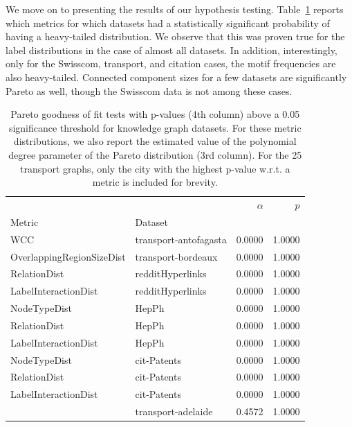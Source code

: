 We move on to presenting the results of our hypothesis testing. Table~\ref{tab:pareto} reports which metrics for which datasets had a statistically significant probability of having a heavy-tailed distribution. We observe that this was proven true for the label distributions in the case of almost all datasets. In addition, interestingly, only for the Swisscom, transport, and citation cases, the motif frequencies are also heavy-tailed. Connected component sizes for a few datasets are significantly Pareto as well, though the Swisscom data is not among these cases.

\begin{table}[hb!]
    \centering
\caption[Pareto goodness of fit tests with p-values above a 0.05 significance threshold for knowledge graph datasets.]{Pareto goodness of fit tests with p-values (4th column) above a 0.05 significance threshold for knowledge graph datasets. For these metric distributions, we also report the estimated value of the polynomial degree parameter of the Pareto distribution (3rd column). For the 25 transport graphs, only the city with the highest p-value w.r.t. a metric is included for brevity.}
\label{tab:pareto}
\begin{adjustbox}{width=0.75\columnwidth}
\begin{tabular}{llrr}
\toprule
             &                   &  $\alpha$ &  $p$ \\
Metric & Dataset &              &               \\
\midrule
WCC & transport-antofagasta &       0.0000 &        1.0000 \\
OverlappingRegionSizeDist & transport-bordeaux &       0.0000 &        1.0000 \\
RelationDist & redditHyperlinks &       0.0000 &        1.0000 \\
LabelInteractionDist & redditHyperlinks &       0.0000 &        1.0000 \\
NodeTypeDist & HepPh &       0.0000 &        1.0000 \\
RelationDist & HepPh &       0.0000 &        1.0000 \\
LabelInteractionDist & HepPh &       0.0000 &        1.0000 \\
NodeTypeDist & cit-Patents &       0.0000 &        1.0000 \\
RelationDist & cit-Patents &       0.0000 &        1.0000 \\
LabelInteractionDist & cit-Patents &       0.0000 &        1.0000 \\
             & transport-adelaide &       0.4572 &        1.0000 \\

\end{tabular}
\end{adjustbox}
\end{table}
